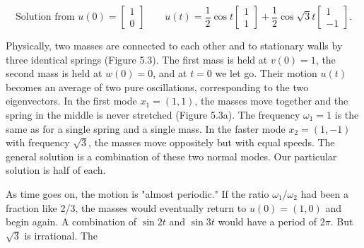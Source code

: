 \[\text{{Solution from }}u(0)=\begin{bmatrix}1\\ 0\end{bmatrix}\qquad u(t)=\frac{1}{2}\cos t\begin{bmatrix}1\\ 1\end{bmatrix}+\frac{1}{2}\cos\sqrt{3}t\begin{bmatrix}1\\ -1\end{bmatrix}.\]

Physically, two masses are connected to each other and to stationary walls by three identical springs (Figure 5.3). The first mass is held at \(v(0)=1\), the second mass is held at \(w(0)=0\), and at \(t=0\) we let go. Their motion \(u(t)\) becomes an average of two pure oscillations, corresponding to the two eigenvectors. In the first mode \(x_{1}=(1,1)\), the masses move together and the spring in the middle is never stretched (Figure 5.3a). The frequency \(\omega_{1}=1\) is the same as for a single spring and a single mass. In the faster mode \(x_{2}=(1,-1)\) with frequency \(\sqrt{3}\), the masses move oppositely but with equal speeds. The general solution is a combination of these two normal modes. Our particular solution is half of each.

As time goes on, the motion is "almost periodic." If the ratio \(\omega_{1}/\omega_{2}\) had been a fraction like 2/3, the masses would eventually return to \(u(0)=(1,0)\) and begin again. A combination of \(\sin 2t\) and \(\sin 3t\) would have a period of \(2\pi\). But \(\sqrt{3}\) is irrational. The 